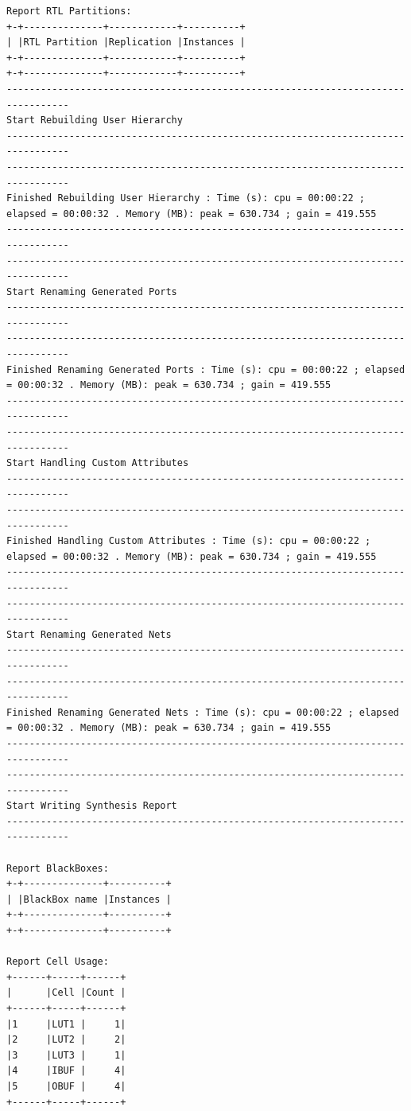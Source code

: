 \documentclass[a4paper, 12pt]{article}
\begin{document}
\begin{verbatim}
Report RTL Partitions: 
+-+--------------+------------+----------+
| |RTL Partition |Replication |Instances |
+-+--------------+------------+----------+
+-+--------------+------------+----------+
---------------------------------------------------------------------------------
Start Rebuilding User Hierarchy
---------------------------------------------------------------------------------
---------------------------------------------------------------------------------
Finished Rebuilding User Hierarchy : Time (s): cpu = 00:00:22 ; elapsed = 00:00:32 . Memory (MB): peak = 630.734 ; gain = 419.555
---------------------------------------------------------------------------------
---------------------------------------------------------------------------------
Start Renaming Generated Ports
---------------------------------------------------------------------------------
---------------------------------------------------------------------------------
Finished Renaming Generated Ports : Time (s): cpu = 00:00:22 ; elapsed = 00:00:32 . Memory (MB): peak = 630.734 ; gain = 419.555
---------------------------------------------------------------------------------
---------------------------------------------------------------------------------
Start Handling Custom Attributes
---------------------------------------------------------------------------------
---------------------------------------------------------------------------------
Finished Handling Custom Attributes : Time (s): cpu = 00:00:22 ; elapsed = 00:00:32 . Memory (MB): peak = 630.734 ; gain = 419.555
---------------------------------------------------------------------------------
---------------------------------------------------------------------------------
Start Renaming Generated Nets
---------------------------------------------------------------------------------
---------------------------------------------------------------------------------
Finished Renaming Generated Nets : Time (s): cpu = 00:00:22 ; elapsed = 00:00:32 . Memory (MB): peak = 630.734 ; gain = 419.555
---------------------------------------------------------------------------------
---------------------------------------------------------------------------------
Start Writing Synthesis Report
---------------------------------------------------------------------------------

Report BlackBoxes: 
+-+--------------+----------+
| |BlackBox name |Instances |
+-+--------------+----------+
+-+--------------+----------+

Report Cell Usage: 
+------+-----+------+
|      |Cell |Count |
+------+-----+------+
|1     |LUT1 |     1|
|2     |LUT2 |     2|
|3     |LUT3 |     1|
|4     |IBUF |     4|
|5     |OBUF |     4|
+------+-----+------+


\end{verbatim}
\end{document}
